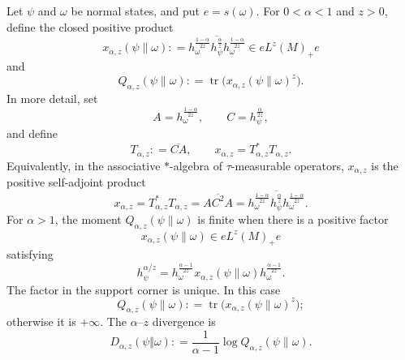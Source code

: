 \documentclass[12pt]{article}
\numberwithin{equation}{section}
\theoremstyle{definition}
\theoremstyle{remark}
\newcommand{\az}{$\alpha$--$z$}
\newcommand{\?}{\overset{?}{=}}
\newcommand{\defeq}{\mathrel{\mathop:}=}
\DeclareMathOperator{\tr}{tr}
\begin{document}
Let $\psi$ and $\omega$ be normal states, and put $e=s(\omega)$.  For
$0<\alpha<1$ and $z>0$, define the closed positive product
\begin{equation}
  x_{\alpha,z}(\psi\|\omega)
  \defeq \overline{
    h_\omega^{\frac{1-\alpha}{2z}}
    h_\psi^{\frac\alpha z}
    h_\omega^{\frac{1-\alpha}{2z}}
  }\in eL^z(M)_+e
  \label{eq:lower-alpha-z-factor}
\end{equation}
and
\begin{equation}
  Q_{\alpha,z}(\psi\|\omega)
  \defeq \tr\bigl(x_{\alpha,z}(\psi\|\omega)^z\bigr).
  \label{eq:lower-alpha-z-moment}
\end{equation}
In more detail, set
\begin{equation}
    A = h_\omega^{\frac{1-\alpha}{2z}},
    \qquad
    C = h_\psi^{\frac\alpha{2z}},
\end{equation}
and define
\begin{equation}
    T_{\alpha,z}
    \defeq \overline{CA},
    \qquad
    x_{\alpha,z}
    =T_{\alpha,z}^*T_{\alpha,z}.
\end{equation}
Equivalently, in the associative $*$-algebra of $\tau$-measurable operators, $x_{\alpha,z}$ is the positive self-adjoint product
\begin{equation}
    x_{\alpha,z}
    =T_{\alpha,z}^*T_{\alpha,z}
    =\overline{AC^2A}
    =\overline{
    h_\omega^{\frac{1-\alpha}{2z}}
    h_\psi^{\frac\alpha z}
    h_\omega^{\frac{1-\alpha}{2z}}
  }.
\end{equation}
For $\alpha>1$, the moment $Q_{\alpha,z}(\psi\|\omega)$ is finite when there is a positive factor \cite{Kato:2023aro, Kato:2023hlj}
\begin{equation}
  x_{\alpha,z}(\psi\|\omega)\in eL^z(M)_+e
  \label{eq:upper-alpha-z-corner}
\end{equation}
satisfying
\begin{equation}
  h_\psi^{\alpha/z}
  =h_\omega^{\frac{\alpha-1}{2z}}
   x_{\alpha,z}(\psi\|\omega)
   h_\omega^{\frac{\alpha-1}{2z}}.
  \label{eq:upper-alpha-z-factor}
\end{equation}
The factor in the support corner is unique.  In this case
\begin{equation}
  Q_{\alpha,z}(\psi\|\omega)
  \defeq \tr\bigl(x_{\alpha,z}(\psi\|\omega)^z\bigr);
  \label{eq:upper-alpha-z-moment}
\end{equation}
otherwise it is $+\infty$.  The {\az} divergence is
\begin{equation}
  D_{\alpha,z}(\psi\Vert\omega)
  \defeq \frac{1}{\alpha-1}
  \log Q_{\alpha,z}(\psi\|\omega).
  \label{eq:algebraic-alpha-z-divergence}
\end{equation}
\end{document}
